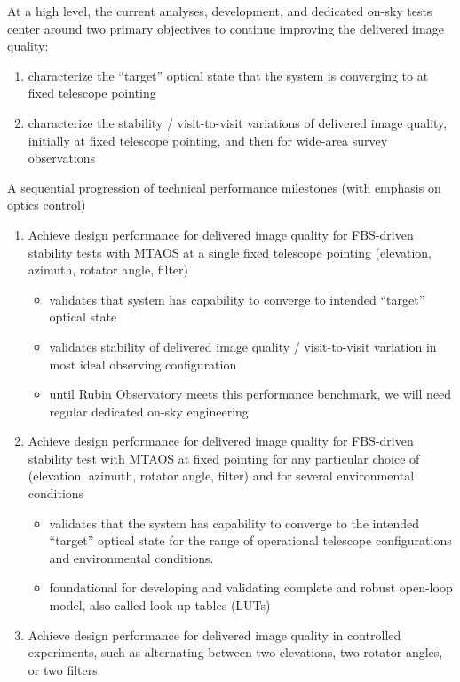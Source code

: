 \documentclass[SO,lsst,authoryear,toc]{lsstdoc}
\begin{document}
At a high level, the current analyses, development, and dedicated on-sky tests center around two primary objectives to continue improving the delivered image quality:

\begin{enumerate}
  \item characterize the ``target'' optical state that the system is converging to at fixed telescope pointing
  \item characterize the stability / visit-to-visit variations of delivered image quality, initially at fixed telescope pointing, and then for wide-area survey observations
\end{enumerate}

A sequential progression of technical performance milestones (with emphasis on optics control)

\begin{enumerate}
  \item Achieve design performance for delivered image quality for FBS-driven stability tests with MTAOS at a single fixed telescope pointing (elevation, azimuth, rotator angle, filter)
  \begin{itemize}
    \item validates that system has capability to converge to intended “target” optical state
    \item validates stability of delivered image quality / visit-to-visit variation in most ideal observing configuration
    \item until Rubin Observatory meets this performance benchmark, we will need regular dedicated on-sky engineering
  \end{itemize}
  \item Achieve design performance for delivered image quality for FBS-driven stability test with MTAOS at fixed pointing for any particular choice of (elevation, azimuth, rotator angle, filter) and for several environmental conditions
  \begin{itemize}
    \item validates that the system has capability to converge to the intended “target” optical state for the range of operational telescope configurations and environmental conditions.
    \item foundational for developing and validating complete and robust open-loop model, also called look-up tables (LUTs)
  \end{itemize}
  \item Achieve design performance for delivered image quality in controlled experiments, such as alternating between two elevations, two rotator angles, or two filters

\end{enumerate}
\end{document}
